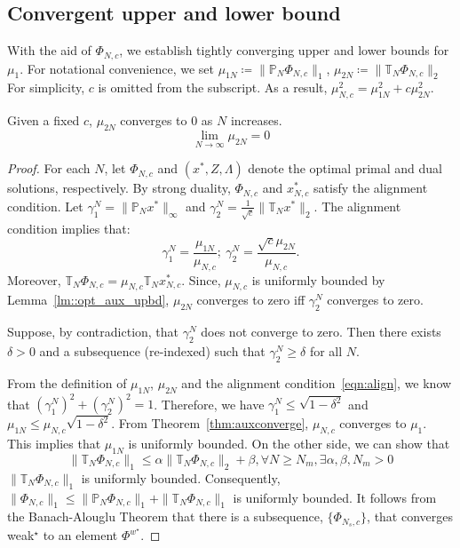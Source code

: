 \subsection{Convergent upper and lower bound}
With the aid of \(\Phi_{N,c}\), we establish tightly converging upper and lower bounds for \(\mu_{1}\).
For notational convenience, we set \(\mu_{1N} \coloneqq \|\mathbb{P}_N \Phi_{N,c}\|_1\), \(\mu_{2N} \coloneqq \|\mathbb{T}_N \Phi_{N,c}\|_2\)
For simplicity, \(c\) is omitted from the subscript. As a result, \(\mu_{N,c}^2 = \mu_{1N}^2 + c \mu_{2N}^2\).
\begin{thm}\label{thm::H2tailto0}
Given a fixed \(c\), \(\mu_{2N}\) converges to 0 as \(N\) increases.
\[
\lim_{N\rightarrow \infty} \mu_{2N} = 0
\]
\end{thm}
\begin{proof}
For each $N$, let $\Phi_{N,c}$ and $\left(x^*, Z, \Lambda \right)$ denote the optimal primal and dual solutions, respectively. By strong duality, $\Phi_{N,c}$ and $x_{N,c}^*$ satisfy the alignment condition. Let \(\gamma_1^N =\|\mathbb{P}_N x^*\|_\infty\) and \(\gamma_2^N = \frac{1}{\sqrt{c}}\|\mathbb{T}_N x^*\|_2\). The alignment condition implies that:
\begin{equation}\label{eqn:align}
\gamma_1^N = \frac{\mu_{1N}}{\mu_{N,c}};\ \gamma_2^N = \frac{\sqrt{c} \mu_{2N}}{\mu_{N,c}}.    
\end{equation}
Moreover, \(\mathbb{T}_N \Phi_{N,c}= \mu_{N,c} \mathbb{T}_N x_{N,c}^*\). Since, \(\mu_{N,c}\) is uniformly bounded by Lemma~\ref{lm::opt_aux_upbd}, \(\mu_{2N}\) converges to zero iff \(\gamma_2^N\) converges to zero.

Suppose, by contradiction, that $\gamma_2^N$ does not converge to zero. Then there exists $\delta > 0$ and a subsequence (re-indexed) such that $\gamma_2^N \ge \delta$ for all $N$. 

From the definition of \(\mu_{1N}\), \(\mu_{2N}\) and the alignment condition~\eqref{eqn:align}, we know that \({(\gamma_1^N)}^2 + {(\gamma_2^N)}^2 = 1\).
Therefore, we have \(\gamma_1^N\leq \sqrt{1 -\delta^2}\) and \(\mu_{1N}\leq \mu_{N,c} \sqrt{1 -\delta^2}\). From Theorem~\ref{thm:auxconverge}, \(\mu_{N,c}\) converges to \(\mu_1\). This implies that \(\mu_{1N}\) is uniformly bounded. On the other side, we can show that
\[
\|\mathbb{T}_N \Phi_{N,c}\|_1 \leq \alpha \|\mathbb{T}_N \Phi_{N,c}\|_2 + \beta, \forall N \geq N_m,\exists \alpha, \beta, N_m >0
\]
\(\|\mathbb{T}_N \Phi_{N,c}\|_1\) is uniformly bounded. Consequently, \(\|\Phi_{N,c}\|_1 \leq \|\mathbb{P}_{N} \Phi_{N,c}\|_1 + \|\mathbb{T}_{N} \Phi_{N,c}\|_1\) is uniformly bounded. It follows from the Banach-Alouglu Theorem that there is a subsequence, \(\{\Phi_{N_s,c}\}\), that converges weak${}^\star$ to an element \(\Phi^{w^\star}\). 


\end{proof}
